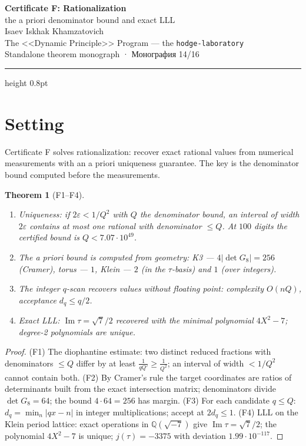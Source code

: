 \documentclass[11pt,a4paper]{article}
\theoremstyle{plain}
\newtheorem{theorem}{Theorem}
\theoremstyle{definition}
\theoremstyle{remark}
\newcommand{\QQ}{\mathbb{Q}}
\newcommand{\im}{\operatorname{Im}}
\begin{document}
\begin{center}
{\LARGE\bfseries Certificate F: Rationalization}\\[0.4em]
{\large the a priori denominator bound and exact LLL}\\[0.6em]
{\normalsize Isaev Iskhak Khamzatovich}\\[0.2em]
{\normalsize The <<Dynamic Principle>> Program --- the \texttt{hodge-laboratory}}\\[0.15em]
{\small Standalone theorem monograph · Монография 14/16}
\end{center}
\vspace{0.4em}
{\color{linkblue}\hrule height 0.8pt}
\vspace{0.8em}

\section{Setting}

Certificate F solves rationalization: recover exact rational values
from numerical measurements with an a priori uniqueness guarantee.
The key is the denominator bound computed before the measurements.

\begin{theorem}[F1--F4]\label{th:Fstand}
\begin{enumerate}[leftmargin=2em]
\item[(F1)] Uniqueness: if $2\varepsilon<1/Q^2$ with $Q$ the
denominator bound, an interval of width $2\varepsilon$ contains at
most one rational with denominator $\le Q$. At $100$ digits the
certified bound is $Q<7.07\cdot10^{49}$.
\item[(F2)] The a priori bound is computed from geometry: K3 ---
$4|\det G_8|=256$ (Cramer), torus --- $1$, Klein --- $2$ (in the
$\tau$-basis) and $1$ (over integers).
\item[(F3)] The integer $q$-scan recovers values without floating
point: complexity $O(nQ)$, acceptance $d_q\le q/2$.
\item[(F4)] Exact LLL: $\im\tau=\sqrt7/2$ recovered with the minimal
polynomial $4X^2-7$; degree-2 polynomials are unique.
\end{enumerate}
\end{theorem}

\begin{proof}
(F1) The diophantine estimate: two distinct reduced fractions with
denominators $\le Q$ differ by at least $\frac1{qQ'}\ge\frac1{Q^2}$;
an interval of width $<1/Q^2$ cannot contain both.
(F2) By Cramer's rule the target coordinates are ratios of
determinants built from the exact intersection matrix; denominators
divide $\det G_8=64$; the bound $4\cdot64=256$ has margin.
(F3) For each candidate $q\le Q$: $d_q=\min_n|qx-n|$ in integer
multiplications; accept at $2d_q\le1$.
(F4) LLL on the Klein period lattice: exact operations in
$\QQ(\sqrt{-7})$ give $\im\tau=\sqrt7/2$; the polynomial $4X^2-7$ is
unique; $j(\tau)=-3375$ with deviation $1.99\cdot10^{-117}$.
\end{proof}
\end{document}
